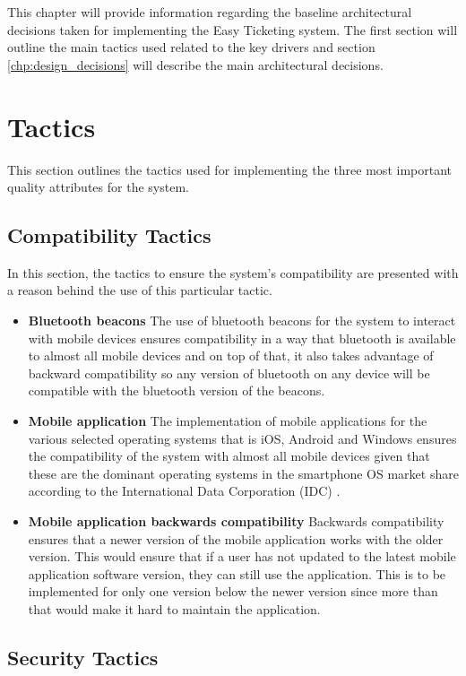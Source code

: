 This chapter will provide information regarding the baseline architectural decisions taken for implementing the Easy Ticketing system. The first section will outline the main tactics used related to the key drivers and section \ref{chp:design_decisions} will describe the main architectural decisions.
 
\section{Tactics}
This section outlines the tactics used for implementing the three most important quality attributes for the system.

\subsection{Compatibility Tactics}
In this section, the tactics to ensure the system's compatibility are presented with a reason behind the use of this particular tactic.
\begin{itemize}
\item \textbf{Bluetooth beacons} 
The use of bluetooth beacons for the system to interact with mobile devices ensures compatibility in a way that bluetooth is available to almost all mobile devices and on top of that, it also takes advantage of backward compatibility so any version of bluetooth on any device will be compatible with the bluetooth version of the beacons.

\item \textbf{Mobile application}
The implementation of mobile applications for the various selected operating systems that is iOS, Android and Windows ensures the compatibility of the system with almost all mobile devices given that these are the dominant operating systems in the smartphone OS market share according to the International Data Corporation (IDC) \cite{web:IDC}.

\item \textbf{Mobile application backwards compatibility}
Backwards compatibility ensures that a newer version of the mobile application works with the older version. This would ensure that if a user has not updated to the latest mobile application software version, they can still use the application. This is to be implemented for only one version below the newer version since more than that would make it hard to maintain the application. 
\end{itemize}
\subsection{Security Tactics}

